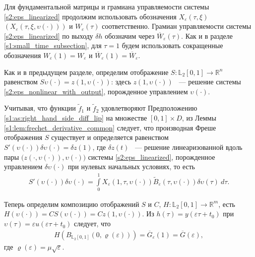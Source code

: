 \documentclass[../main.tex]{subfiles}
\begin{document}
Для фундаментальной матрицы и грамиана управляемости системы \eqref{s2:eps_linearized} продолжим использовать обозначения  $ X_{\varepsilon}(\tau,\xi) $ $(X_{\varepsilon}(\tau, \xi, \upsilon(\cdot)))$ и $W_{\varepsilon}(\tau)$ соответственно. 
Грамиан управляемости системы \eqref{s2:eps_linearized} по выходу $ \delta h$ обозначим через $\overline{W}_{\varepsilon}(\tau)$. 
Как и в разделе \ref{s1:small_time_subsection}, для $\tau = 1$ будем использовать сокращенные обозначения $W_{\varepsilon}(1) = W_{\varepsilon}$ и $\overline{W}_{\varepsilon}(1) = \overline{W}_{\varepsilon}$. 

Как и в предыдущем разделе, определим отображение $S: \mathbb{L}_2[0,1] \rightarrow \mathbb{R}^n $ равенством $S\upsilon(\cdot) = z(1,\upsilon(\cdot))$: здесь $ z(1,\upsilon(\cdot))$ ~--- решение системы \eqref{s2:eps_nonlinear_with_output}, порожденное управлением $\upsilon(\cdot)$. 

Учитывая, что функции  $\widetilde{f}_1$ и $\widetilde{f}_2$ удовлетворяют Предположению \ref{s1:as:right_hand_side_diff_lip} на множестве $[0, 1]\times D$, из Леммы \ref{s1:lem:frechet_derivative_common}  следует, что производная Фреше отображения $S$ существует и определяется равенством $ S'(\upsilon(\cdot))\delta \upsilon(\cdot) = \delta z(1)$, где $\delta z(t)$ ~--- решение линеаризованной вдоль пары $\big( z(\cdot,\upsilon(\cdot)),\upsilon(\cdot)\big)  $ системы \eqref{s2:eps_linearized}, порожденное управлением $\delta \upsilon(\cdot)$ при нулевых начальных условиях, то есть
\begin{gather}\label{s2:freсhet_differential_of_scaled_map}
	S'(\upsilon(\cdot))\delta \upsilon(\cdot) = \int\limits_0^1  X_{\varepsilon}(1, \tau, \upsilon(\cdot)) \widetilde{B}_{\varepsilon}(\tau, \upsilon(\cdot))  \delta\upsilon(\tau)\ d\tau. 
\end{gather}

 Теперь определим композицию отображений $ S $ и $ C $, $ H: \mathbb{L}_2[0,1]  \rightarrow \mathbb{R}^m $, есть $ H(\upsilon(\cdot)) = C S(\upsilon(\cdot)) = C z(1,\upsilon(\cdot)) $. 
Из $h(\tau) = y(\varepsilon \tau + t_0)$ при $ \upsilon(\tau) = \varepsilon u(\varepsilon \tau + t_0) $ следует, что  
\begin{gather*}
	H(B_{\mathbb{L}_2[0,1]}(0,\varrho(\varepsilon))) = \overline{G}_{\varepsilon}(1) = \overline{G}(\varepsilon), 
\end{gather*}
где $ \varrho(\varepsilon) = \mu \sqrt{\varepsilon} $.
\end{document}
